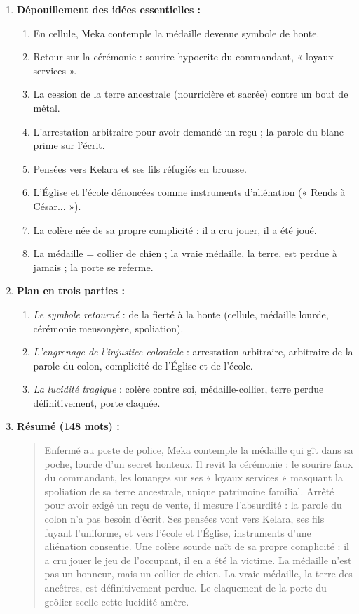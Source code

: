 \documentclass[11pt]{article}
\begin{document}
\begin{corrige}
\begin{enumerate}
    \item \textbf{Dépouillement des idées essentielles :}
    \begin{enumerate}
        \item En cellule, Meka contemple la médaille devenue symbole de honte.
        \item Retour sur la cérémonie : sourire hypocrite du commandant, « loyaux services ».
        \item La cession de la terre ancestrale (nourricière et sacrée) contre un bout de métal.
        \item L'arrestation arbitraire pour avoir demandé un reçu ; la parole du blanc prime sur l'écrit.
        \item Pensées vers Kelara et ses fils réfugiés en brousse.
        \item L'Église et l'école dénoncées comme instruments d'aliénation (« Rends à César... »).
        \item La colère née de sa propre complicité : il a cru jouer, il a été joué.
        \item La médaille = collier de chien ; la vraie médaille, la terre, est perdue à jamais ; la porte se referme.
    \end{enumerate}
    \item \textbf{Plan en trois parties :}
    \begin{enumerate}
        \item \emph{Le symbole retourné} : de la fierté à la honte (cellule, médaille lourde, cérémonie mensongère, spoliation).
        \item \emph{L'engrenage de l'injustice coloniale} : arrestation arbitraire, arbitraire de la parole du colon, complicité de l'Église et de l'école.
        \item \emph{La lucidité tragique} : colère contre soi, médaille-collier, terre perdue définitivement, porte claquée.
    \end{enumerate}
    \item \textbf{Résumé (148 mots) :}
    \begin{quote}
    Enfermé au poste de police, Meka contemple la médaille qui gît dans sa poche, lourde d'un secret honteux. Il revit la cérémonie : le sourire faux du commandant, les louanges sur ses « loyaux services » masquant la spoliation de sa terre ancestrale, unique patrimoine familial. Arrêté pour avoir exigé un reçu de vente, il mesure l'absurdité : la parole du colon n'a pas besoin d'écrit. Ses pensées vont vers Kelara, ses fils fuyant l'uniforme, et vers l'école et l'Église, instruments d'une aliénation consentie. Une colère sourde naît de sa propre complicité : il a cru jouer le jeu de l'occupant, il en a été la victime. La médaille n'est pas un honneur, mais un collier de chien. La vraie médaille, la terre des ancêtres, est définitivement perdue. Le claquement de la porte du geôlier scelle cette lucidité amère.

\end{quote}
\end{enumerate}
\end{corrige}
\end{document}
